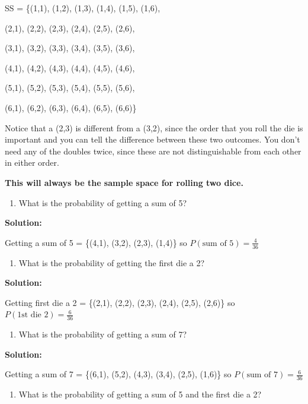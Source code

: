\documentclass[]{book}
\providecommand{\tightlist}{%
  \setlength{\itemsep}{0pt}\setlength{\parskip}{0pt}}
\begin{document}
SS = \{(1,1), (1,2), (1,3), (1,4), (1,5), (1,6),

(2,1), (2,2), (2,3), (2,4), (2,5), (2,6),

(3,1), (3,2), (3,3), (3,4), (3,5), (3,6),

(4,1), (4,2), (4,3), (4,4), (4,5), (4,6),

(5,1), (5,2), (5,3), (5,4), (5,5), (5,6),

(6,1), (6,2), (6,3), (6,4), (6,5), (6,6)\}

Notice that a (2,3) is different from a (3,2), since the order that you roll the die is important and you can tell the difference between these two outcomes. You don't need any of the doubles twice, since these are not distinguishable from each other in either order.

\textbf{This will always be the sample space for rolling two dice.}

\begin{enumerate}
\def\labelenumi{\alph{enumi}.}
\setcounter{enumi}{1}
\tightlist
\item
  What is the probability of getting a sum of 5?
\end{enumerate}

\textbf{Solution:}

Getting a sum of 5 = \{(4,1), (3,2), (2,3), (1,4)\} so \(P(\text{sum of 5})=\frac{4}{36}\)

\begin{enumerate}
\def\labelenumi{\alph{enumi}.}
\setcounter{enumi}{2}
\tightlist
\item
  What is the probability of getting the first die a 2?
\end{enumerate}

\textbf{Solution:}

Getting first die a 2 = \{(2,1), (2,2), (2,3), (2,4), (2,5),
(2,6)\} so \(P(\text{1st die 2})=\frac{6}{36}\)

\begin{enumerate}
\def\labelenumi{\alph{enumi}.}
\setcounter{enumi}{3}
\tightlist
\item
  What is the probability of getting a sum of 7?
\end{enumerate}

\textbf{Solution:}

Getting a sum of 7 = \{(6,1), (5,2), (4,3), (3,4), (2,5),
(1,6)\} so \(P(\text{sum of 7})=\frac{6}{36}\)

\begin{enumerate}
\def\labelenumi{\alph{enumi}.}
\setcounter{enumi}{4}
\tightlist
\item
  What is the probability of getting a sum of 5 and the first die a 2?
\end{enumerate}
\end{document}
